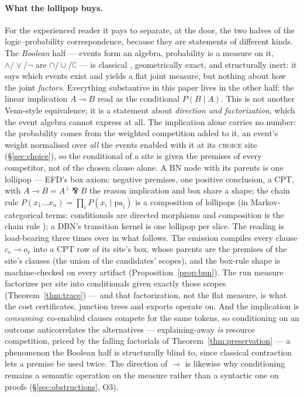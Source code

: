 \documentclass[11pt]{article}
\newcommand{\lolli}{\multimap}
\newcommand{\parr}{\bindnasrepma}    %
\theoremstyle{plain}
\theoremstyle{definition}
\theoremstyle{remark}
\begin{document}
\paragraph{What the lollipop buys.} For the experienced reader it
pays to separate, at the door, the two halves of the logic--probability
correspondence, because they are statements of different kinds. The
\emph{Boolean} half --- events form an algebra, probability is a
measure on it, $\wedge/\vee/\neg$ are $\cap/\cup/\complement$ --- is
classical \cite{Kol33}, geometrically exact, and structurally inert:
it says which events exist and yields a flat joint measure, but
nothing about how the joint \emph{factors}. Everything substantive in
this paper lives in the other half: the linear implication
$A \lolli B$ read as the conditional $P(B \mid A)$. This is not
another Venn-style equivalence; it is a statement about
\emph{direction and factorization}, which the event algebra cannot
express at all. The implication alone carries no number: the
probability comes from the weighted competition added to it, an event's
weight normalised over \emph{all} the events enabled with it at its
\textsc{choice} site (\S\ref{sec:choice}), so the conditional of a site
is given the premises of every competitor, not of the chosen clause
alone. A BN node with its parents is one lollipop --- EFD's
box axiom: negative premises, one positive conclusion, a CPT, with
$A \lolli B = A^\perp \parr B$ \cite{Gir87} the reason implication
and box share a shape; the chain rule
$P(x_1 \ldots x_n) = \prod_i P(x_i \mid \mathrm{pa}_i)$ is a
composition of lollipops (in Markov-categorical terms: conditionals
are directed morphisms and composition is the chain rule
\cite{CJ19,Fri20}); a DBN's transition kernel is one lollipop per
slice. The reading is load-bearing three times over in what follows.
The emission compiles every clause $c_r \lolli o_r$ into a CPT row
of its site's box, whose parents are the premises of the site's
clauses (the union of the candidates' scopes), and the box-rule
shape is machine-checked on every artifact
(Proposition~\ref{prop:bpn}). The run measure factorizes per site
into conditionals given exactly those scopes
(Theorem~\ref{thm:trace}) --- and that factorization, not the flat
measure, is what the cost certificates, junction trees and exports
operate on. And the implication is \emph{consuming}: co-enabled
clauses compete for the same tokens, so conditioning on an outcome
anticorrelates the alternatives --- explaining-away \emph{is}
resource competition, priced by the falling factorials of
Theorem~\ref{thm:preservation} --- a phenomenon the Boolean half is
structurally blind to, since classical contraction lets a premise be
used twice. The direction of $\lolli$ is likewise why conditioning
remains a semantic operation on the measure rather than a syntactic
one on proofs (\S\ref{sec:obstructions}, O3).
\end{document}
